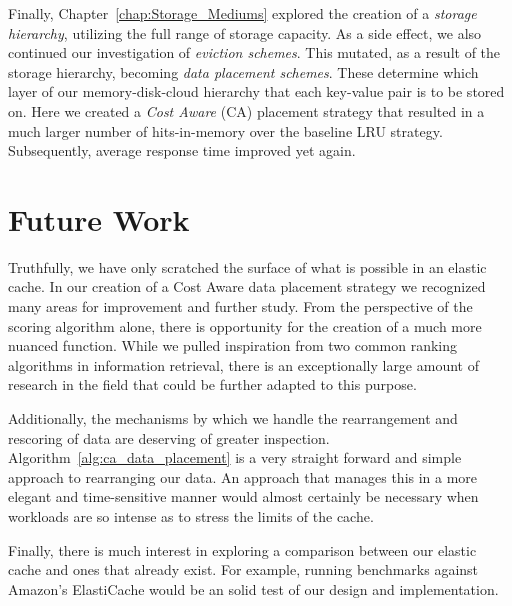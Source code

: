 Finally, Chapter~\ref{chap:Storage_Mediums} explored the creation of a
\emph{storage hierarchy}, utilizing the full range of storage capacity. As a
side effect, we also continued our investigation of \emph{eviction schemes}.
This mutated, as a result of the storage hierarchy, becoming \emph{data
placement schemes}. These determine which layer of our memory-disk-cloud
hierarchy that each key-value pair is to be stored on. Here we created a
\emph{Cost Aware} (CA) placement strategy that resulted in a much larger number
of hits-in-memory over the baseline LRU strategy. Subsequently, average response
time improved yet again.


\section{Future Work} %
\label{sec:future_work}
Truthfully, we have only scratched the surface of what is possible in an
elastic cache. In our creation of a Cost Aware data placement strategy we
recognized many areas for improvement and further study. From the perspective
of the scoring algorithm alone, there is opportunity for the creation of a much
more nuanced function. While we pulled inspiration from two common ranking
algorithms in information retrieval\cite{tfidf,bm25}, there is an exceptionally
large amount of research in the field that could be further adapted to this
purpose.

Additionally, the mechanisms by which we handle the rearrangement and rescoring
of data are deserving of greater inspection.
Algorithm~\ref{alg:ca_data_placement} is a very straight forward and simple
approach to rearranging our data. An approach that manages this in a more
elegant and time-sensitive manner would almost certainly be necessary when
workloads are so intense as to stress the limits of the cache.

Finally, there is much interest in exploring a comparison between our elastic
cache and ones that already exist. For example, running benchmarks against
Amazon's ElastiCache\cite{amazonElastiCache} would be an solid test of our
design and implementation.

